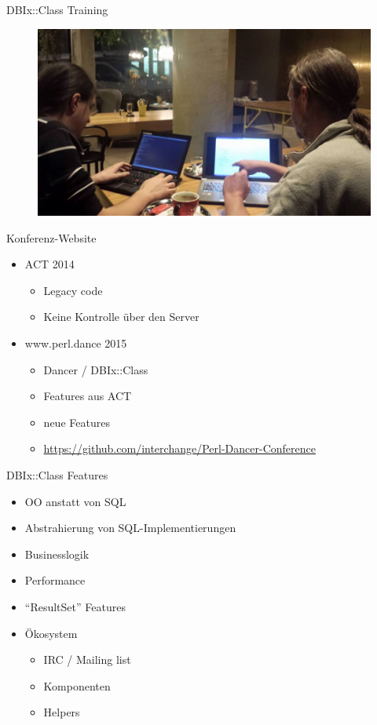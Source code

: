\begin{frame}{DBIx::Class Training}
\begin{figure}[!ht]
\centering
\includegraphics[width=1\linewidth]{img/training-preps.jpg}
\end{figure}
\end{frame}


\begin{frame}[fragile]{Konferenz-Website}
\begin{itemize}
\item ACT 2014
\begin{itemize}
\item Legacy code
\item Keine Kontrolle über den Server
\end{itemize}
\item www.perl.dance 2015
\begin{itemize}
\item Dancer / DBIx::Class
\item Features aus ACT
\item neue Features
\item \url{https://github.com/interchange/Perl-Dancer-Conference}
\end{itemize}
\end{itemize}
\end{frame}

\begin{frame}{DBIx::Class Features}
\begin{itemize}
\item OO anstatt von SQL
\item Abstrahierung von SQL-Implementierungen
\item Businesslogik
\item Performance
\item ``ResultSet'' Features
\item Ökosystem
\begin{itemize}
\item IRC / Mailing list
\item Komponenten
\item Helpers
\end{itemize}
\end{itemize}
\end{frame}

